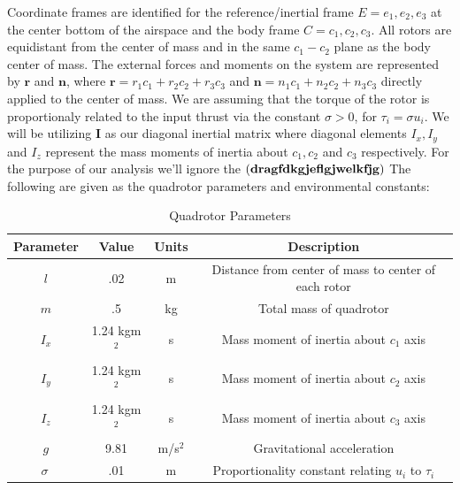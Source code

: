 \documentclass{article}
\begin{document}
\noindent Coordinate frames are identified for the reference/inertial frame $E={e_1, e_2, e_3}$ at the center bottom of the airspace and the body frame $C={c_1, c_2, c_3}$.  All rotors are equidistant from the center of mass and in the same $c_1-c_2 $ plane as the body center of mass.  The external forces and moments on the system are represented by $\boldsymbol{r}$ and $\boldsymbol{n}$, where $\boldsymbol{r} = r_1 c_1 + r_2 c_2 + r_3 c_3$ and $\boldsymbol{n} = n_1 c_1 + n_2 c_2 + n_3 c_3$ directly applied to the center of mass. We are assuming that the torque of the rotor is proportionaly related to the input thrust via the constant $\sigma>0$, for $\tau_i = \sigma u_i$. We will be utilizing $\boldsymbol{I}$ as our diagonal inertial matrix where diagonal elements
 $I_x, I_y $ and $I_z$ represent the mass moments of inertia about $c_1, c_2 $ and $c_3$ respectively.  For the purpose of our analysis we'll ignore the $\bf{(drag fdkgjeflgjwelkfjg)}$
\noindent The following are given as the quadrotor parameters and environmental constants:
\begin{table}[H] %
\begin{centering}
\begin{tabular}{|cccc|}
\hline
Parameter & Value & Units  & Description  \\
\hline
 $l$  &  .02& m & Distance from center of mass to center of each rotor  \\
 $m$& .5 & kg &Total mass of quadrotor   \\
 $I_{x}$ & 1.24 kgm$^2 $ & s  & Mass moment of inertia about $c_1$ axis \\
 $I_{y}$ & 1.24 kgm$^2 $ & s  & Mass moment of inertia about $c_2$ axis \\
 $I_{z}$ & 1.24 kgm$^2 $ & s  & Mass moment of inertia about $c_3$ axis \\
$ g$ &9.81 & m/s$^2$ & Gravitational acceleration\\
$\sigma\ $& .01 & m & Proportionality constant relating $u_i $ to $\tau_i$\\
\hline
\end{tabular}
\caption{Quadrotor Parameters}
\label{tab:Qparams}
\end{centering}
\end{table}
\end{document}
